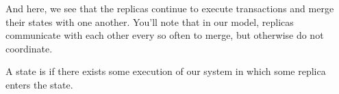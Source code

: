 \begin{frame}
{    And here, we see that the replicas continue to execute transactions and
    merge their states with one another. You'll note that in our model,
    replicas communicate with each other every so often to merge, but otherwise
    do not coordinate. \\[12pt]
  }
\end{frame}

\begin{frame}
  \Huge
  A state is  if there exists some execution of our system
  in which some replica enters the state.

\end{frame}

\begin{frame}
  \begin{center}
    \Large
\end{center}
\end{frame}

